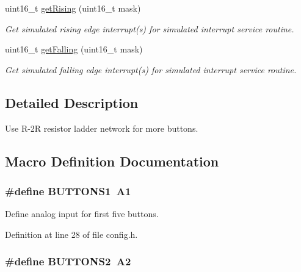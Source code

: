\begin{DoxyCompactItemize}
uint16\+\_\+t \hyperlink{group__buttons_ga9b1decfe9116af4b8853a02aebfa1d14}{get\+Rising} (uint16\+\_\+t mask)
\begin{DoxyCompactList}\small\item\em Get simulated rising edge interrupt(s) for simulated interrupt service routine. \end{DoxyCompactList}\item 
uint16\+\_\+t \hyperlink{group__buttons_ga2971d62e0d7420f71836fb86e0fce92f}{get\+Falling} (uint16\+\_\+t mask)
\begin{DoxyCompactList}\small\item\em Get simulated falling edge interrupt(s) for simulated interrupt service routine. \end{DoxyCompactList}\end{DoxyCompactItemize}


\subsection{Detailed Description}
Use R-\/2R resistor ladder network for more buttons. 



\subsection{Macro Definition Documentation}
\subsubsection[{\texorpdfstring{B\+U\+T\+T\+O\+N\+S1}{BUTTONS1}}]{\setlength{\rightskip}{0pt plus 5cm}\#define B\+U\+T\+T\+O\+N\+S1~A1}\hypertarget{group__buttons_gab47d09cf51ee6fbdc1b7b255f57ec896}{}\label{group__buttons_gab47d09cf51ee6fbdc1b7b255f57ec896}


Define analog input for first five buttons. 



Definition at line 28 of file config.\+h.

\subsubsection[{\texorpdfstring{B\+U\+T\+T\+O\+N\+S2}{BUTTONS2}}]{\setlength{\rightskip}{0pt plus 5cm}\#define B\+U\+T\+T\+O\+N\+S2~A2}\hypertarget{group__buttons_gac3f0a90f8f8169f919f346be1ea485db}{}\label{group__buttons_gac3f0a90f8f8169f919f346be1ea485db}


